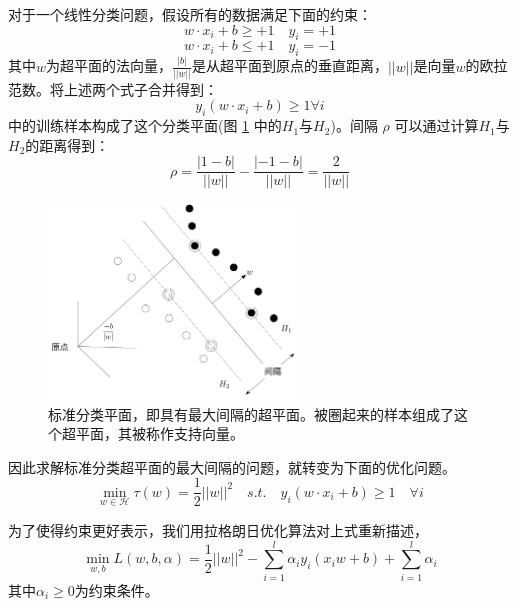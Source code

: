 对于一个线性分类问题，假设所有的数据满足下面的约束：
\begin{equation}
	w\cdot x_i +b \geq + 1 \quad y_i = +1
	\label{equ:constraint1}
\end{equation}
\begin{equation}
	w\cdot x_i +b \leq + 1 \quad y_i = -1
	\label{equ:constraint2}
\end{equation}
其中$w$为超平面的法向量，$\frac{|b|}{||w||}$是从超平面到原点的垂直距离，$||w||$是向量$w$的欧拉范数。将上述两个式子合并得到：
\begin{equation}
	y_i(w\cdot x_i+b)\geq 1 \forall i
	\label{equ:svm}
\end{equation}
 中的训练样本构成了这个分类平面(图 \ref{fig:hyperplanes} 中的$H_1$与$H_2$)。间隔 $\rho$ 可以通过计算$H_1$与$H_2$的距离得到：
\begin{equation}
	\rho=\frac{|1-b|}{||w||}-\frac{|-1-b|}{||w||}=\frac{2}{||w||}
\end{equation}
\begin{figure}[hbt]
	\centering
	\includegraphics[width=6.67cm]{figures/emitter/svm_hard}
	\caption{标准分类平面，即具有最大间隔的超平面。被圈起来的样本组成了这个超平面，其被称作支持向量。}
	\label{fig:hyperplanes}
\end{figure}
因此求解标准分类超平面的最大间隔的问题，就转变为下面的优化问题。
\begin{equation}
	\min \limits_{w\in \mathcal{H}} \tau(w)=\frac{1}{2}||w||^2\quad s.t. \quad y_i(w\cdot x_i +b) \geq 1 \quad \forall i
	\label{equ:optimization}
\end{equation}

为了使得约束更好表示，我们用拉格朗日优化算法对上式重新描述，
\begin{equation}
	\min \limits_{w,b} L(w,b,\alpha)=\frac{1}{2}||w||^2-\sum_{i=1}^l\alpha_i y_i (x_i w + b) + \sum_{i=1}^l{\alpha_i}
	\label{equ:lagrange}
\end{equation}
其中$\alpha_i \geq 0$为约束条件。

